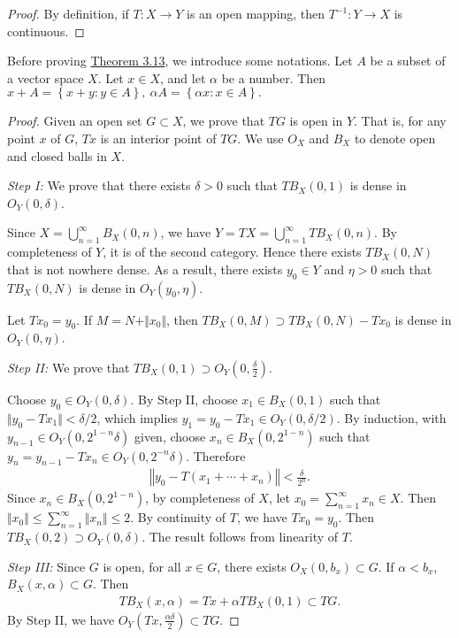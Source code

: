 \documentclass{article}
\renewcommand{\proofname}{\textit{Proof}}
\begin{document}
\renewcommand{\proofname}{Proof of \hyperref[thm:3.12]{Theorem 3.12}}
\begin{proof}
By definition, if $T:X\to Y$ is an open mapping, then $T^{-1}:Y\to X$ is continuous.
\end{proof}
Before proving \hyperref[thm:3.13]{Theorem 3.13}, we introduce some notations. Let $A$ be a subset of a vector space $X$. Let $x\in X$, and let $\alpha$ be a number. Then
$x+A=\left\{x+y:y\in A\right\},\ \alpha A=\left\{\alpha x:x\in A\right\}.$

\renewcommand{\proofname}{Proof of \hyperref[thm:3.13]{Theorem 3.13}}
\begin{proof}
Given an open set $G\subset X$, we prove that $TG$ is open in $Y$. That is, for any point $x$ of $G$, $Tx$ is an interior point of $TG$. We use $O_X$ and $B_X$ to denote open and closed balls in $X$.\vspace{0.1cm}

\textit{Step I:} We prove that there exists $\delta>0$ such that $TB_X(0,1)$ is dense in $O_Y(0,\delta)$.

Since $X=\bigcup_{n=1}^\infty B_X(0,n)$, we have $Y=TX=\bigcup_{n=1}^\infty TB_X(0,n)$. By completeness of $Y$, it is of the second category. Hence there exists $TB_X(0,N)$ that is not nowhere dense. As a result, there exists $y_0\in Y$ and $\eta>0$ such that $TB_X(0,N)$ is dense in $O_Y(y_0,\eta)$.

Let $Tx_0=y_0$. If $M=N+\Vert x_0\Vert$, then $TB_X(0,M)\supset TB_X(0,N) - Tx_0$ is dense in $O_Y(0,\eta)$.

\textit{Step II:} We prove that $TB_X(0,1)\supset O_Y\left(0,\frac{\delta}{2}\right)$. 

Choose $y_0\in O_Y(0,\delta)$. By Step II, choose $x_1\in B_X(0,1)$ such that $\Vert y_0-Tx_1\Vert < \delta/2$, which implies $y_1=y_0-Tx_1\in O_Y(0,\delta/2)$. By induction, with $y_{n-1}\in O_Y\left(0,2^{1-n}\delta\right)$ given, choose $x_n\in B_X(0,2^{1-n})$ such that $y_n=y_{n-1}-Tx_n\in O_Y(0,2^{-n}\delta)$. Therefore
\begin{align*}
	\left\Vert y_0 - T(x_1+\cdots+x_n)\right\Vert<\frac{\delta}{2^n}.
\end{align*}
Since $x_n\in B_X(0,2^{1-n})$, by completeness of $X$, let $x_0=\sum_{n=1}^\infty x_n \in X$. Then $\Vert x_0\Vert\leq\sum_{n=1}^\infty\Vert x_n\Vert\leq 2$. By continuity of $T$, we have $Tx_0 = y_0$. Then	$TB_X(0,2)\supset O_Y(0,\delta)$. The result follows from linearity of $T$.\vspace{0.1cm}

\textit{Step III:} Since $G$ is open, for all $x\in G$, there exists $O_X(0,b_x)\subset G$. If $\alpha<b_x$, $B_X(x,\alpha)\subset G$. Then 
\begin{align*}
	TB_X(x,\alpha)=Tx + \alpha TB_X(0,1)\subset TG.
\end{align*}
By Step II, we have $O_Y(Tx,\frac{\alpha\delta}{2})\subset TG$.
\end{proof}
\renewcommand{\proofname}{Proof}
\end{document}
